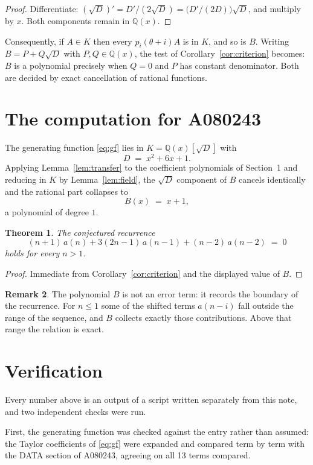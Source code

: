 \documentclass[11pt,a4paper]{article}
\theoremstyle{plain}
\newtheorem{theorem}{Theorem}
\theoremstyle{definition}
\newtheorem{remark}[theorem]{Remark}
\begin{document}
\begin{proof}
Differentiate: $(\sqrt{D})'=D'/(2\sqrt{D})=\bigl(D'/(2D)\bigr)\sqrt{D}$, and multiply by
$x$. Both components remain in $\mathbb{Q}(x)$.
\end{proof}

Consequently, if $A\in K$ then every $p_{i}(\theta+i)A$ is in $K$, and so is $B$. Writing
$B=P+Q\sqrt{D}$ with $P,Q\in\mathbb{Q}(x)$, the test of Corollary~\ref{cor:criterion}
becomes: $B$ is a polynomial precisely when $Q=0$ and $P$ has constant denominator. Both
are decided by exact cancellation of rational functions.

\section{The computation for A080243}

The generating function \eqref{eq:gf} lies in $K=\mathbb{Q}(x)[\sqrt{D}]$ with
\[
D \;=\; x^{2} + 6 x + 1 .
\]
Applying Lemma~\ref{lem:transfer} to the coefficient polynomials of Section~1 and reducing
in $K$ by Lemma~\ref{lem:field}, the $\sqrt{D}$ component of $B$ cancels identically and
the rational part collapses to
\[
B(x)\;=\;x + 1 ,
\]
a polynomial of degree $1$.

\begin{theorem}
The conjectured recurrence
\[
(n + 1)\,a(n) + 3 \left(2 n - 1\right)\,a(n-1) + (n - 2)\,a(n-2) \;=\;0
\]
holds for every $n>1$.
\end{theorem}

\begin{proof}
Immediate from Corollary~\ref{cor:criterion} and the displayed value of $B$.
\end{proof}

\begin{remark}
The polynomial $B$ is not an error term: it records the boundary of the recurrence. For
$n\le1$ some of the shifted terms $a(n-i)$ fall outside the range of the sequence,
and $B$ collects exactly those contributions. Above that range the relation is exact.
\end{remark}

\section{Verification}

Every number above is an output of a script written separately from this note, and two
independent checks were run.

First, the generating function was checked against the entry rather than assumed: the
Taylor coefficients of \eqref{eq:gf} were expanded and compared term by term with the DATA
section of A080243, agreeing on all 13 terms compared.
\end{document}

